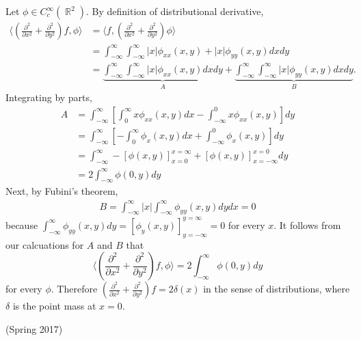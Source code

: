 \documentclass[answers]{exam}
\DeclareMathOperator{\RR}{\mathbb{R}}
\begin{document}
\begin{questions}
\begin{solution}
  Let $\phi\in C_{c}^{\infty}(\RR^{2})$. By definition of distributional derivative, 
  \begin{align*}
    \Big\langle  \left( \frac{\partial ^{2}}{\partial x^{2}}+ \frac{\partial ^{2}}{\partial y^{2}} \right)f, \phi\Big\rangle
    &= \Big\langle f, \left(\frac{\partial ^{2}}{\partial x^{2}}+ \frac{\partial ^{2}}{\partial y^{2}} \right) \phi \Big\rangle\\ 
    &= \int_{-\infty}^{\infty}\int_{-\infty}^{\infty}|x| \phi_{xx}(x,y)+ |x|\phi_{yy}(x,y)dxdy\\
    &= \underbrace{\int_{-\infty}^{\infty}\int_{-\infty}^{\infty}|x| \phi_{xx}(x,y)dxdy}_{A}+ \underbrace{\int_{-\infty}^{\infty}\int_{-\infty}^{\infty}|x|\phi_{yy}(x,y)dxdy}_{B}.
  \end{align*}
  Integrating by parts,
  \begin{align*}
    A&= \int_{-\infty}^{\infty}\left[\int_{0}^{\infty}x \phi_{xx}(x,y)dx - \int_{-\infty}^{0}x\phi_{xx}(x,y)\right]dy\\
     &= \int_{-\infty}^{\infty}\left[-\int_{0}^{\infty}\phi_{x}(x,y)dx + \int_{-\infty}^{0}\phi_{x}(x,y)\right]dy\\
     &= \int_{-\infty}^{\infty} -\left[ \phi(x,y) \right]^{x=\infty}_{x=0}+ \left[ \phi(x,y) \right]^{x=0}_{x=-\infty}dy\\
     &=2\int_{-\infty}^{\infty}\phi(0,y)dy
  \end{align*}
  Next, by Fubini's theorem,
  \begin{align*}
    B= \int_{-\infty}^{\infty}|x|\int_{-\infty}^{\infty}\phi_{yy}(x,y)dydx = 0
  \end{align*}
  because $\int_{-\infty}^{\infty}\phi_{yy}(x,y)dy = \left[ \phi_{y}(x,y) \right]^{y=\infty}_{y=-\infty}= 0$ for every $x$. It follows from our calcuations for $A$ and $B$ that
  \begin{equation*}
    \Big\langle  \left( \frac{\partial ^{2}}{\partial x^{2}}+ \frac{\partial ^{2}}{\partial y^{2}} \right)f, \phi\Big\rangle = 2\int_{-\infty}^{\infty}\phi(0,y)dy
  \end{equation*}
  for every $\phi$. Therefore $\left( \frac{\partial ^{2}}{\partial x^{2}}+ \frac{\partial ^{2}}{\partial y^{2}} \right)f= 2\delta(x)$ in the sense of distributions, where $\delta$ is the point mass at $x=0$.
\end{solution} 


\question (Spring 2017)
\begin{parts}

\end{parts}
\end{questions}
\end{document}
